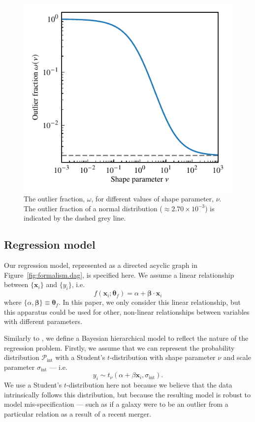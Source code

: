 \documentclass[fleqn,usenatbib]{rasti}
\newcommand{\studentt}[2]{t_\nu \left( #1, #2 \right)}
\newcommand{\depvar}{y_i}
\newcommand{\indepvars}{\boldsymbol{x}_i}
\newcommand{\intscttr}{\sigma_{\text{int}}}
\newcommand{\intercept}{\alpha}
\newcommand{\covariate}{\beta}
\begin{document}
\begin{figure}
	\includegraphics{graphics/outlier_frac.pdf}
    \caption{The outlier fraction, $\omega$, for different values of shape
    parameter, $\nu$. The outlier fraction of a normal distribution ($\approx
    2.70 \times 10^{-3}$) is indicated by the dashed grey line.}
    \label{fig:model.outlier_frac}
\end{figure}

\subsection{Regression model}
\label{sec:formalism.model}

Our regression model, represented as a directed acyclic graph in
Figure~\ref{fig:formalism.dag}, is specified here. We assume a linear
relationship between
$\{\boldsymbol{x}_i\}$ and $\{y_i\}$, i.e.
\begin{equation}
    f(\boldsymbol{x}_i; \boldsymbol{\theta}_f) =
        \alpha + \boldsymbol{\beta} \cdot \boldsymbol{x}_i
\end{equation}
where $\{\alpha, \boldsymbol{\beta}\} \equiv \boldsymbol{\theta}_f$. In this
paper, we only consider this linear relationship, but this apparatus could be
used for other, non-linear relationships between variables with different
parameters.

Similarly to \citet{Kelly:2007}, we define a Bayesian hierarchical model to
reflect the nature of the regression problem. Firstly, we assume that we can
represent the probability distribution $\mathcal P_{\text{int}}$ with a
Student's $t$-distribution with shape parameter $\nu$ and scale parameter
$\sigma_{\text{int}}$ --- i.e.
\begin{equation}
\depvar \sim \studentt{\intercept + \covariate \indepvars}{\intscttr}.
\end{equation}
We use a Student's $t$-distribution here not because we believe that the data
intrinsically follows this distribution, but because the resulting model is
robust to model mis-specification --- such as if a galaxy were
to be an outlier from a particular relation as a result of a recent merger.
\end{document}
